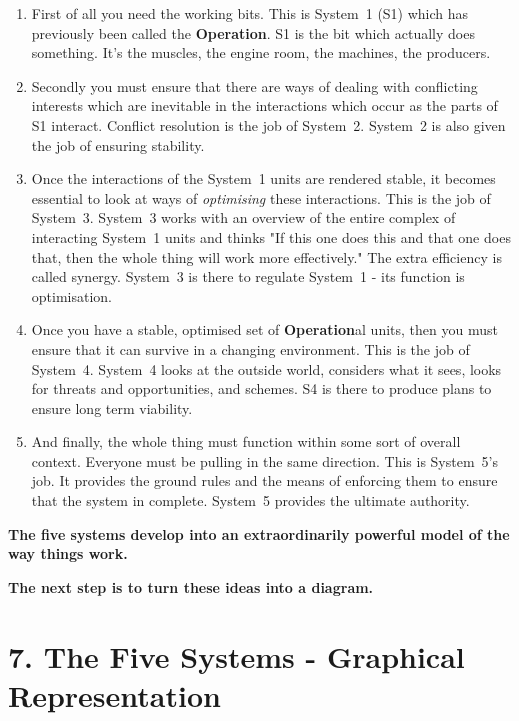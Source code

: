 \begin{enumerate}
  \item First of all you need the working bits. This is System 1 (S1) which has previously been called the \textcolor{O}{\textbf{Operation}}. S1 is the bit which actually does something. It's the muscles, the engine room, the machines, the producers.

  \item Secondly you must ensure that there are ways of dealing with conflicting interests which are inevitable in the interactions which occur as the parts of S1 interact. Conflict resolution is the job of System 2. System 2 is also given the job of ensuring stability.

  \item Once the interactions of the System 1 units are rendered stable, it becomes essential to look at ways of \textit{optimising} these interactions. This is the job of System 3. System 3 works with an overview of the entire complex of interacting System 1 units and thinks "If this one does this and that one does that, then the whole thing will work more effectively." The extra efficiency is called synergy. System 3 is there to regulate System 1 - its function is optimisation.

  \item Once you have a stable, optimised set of \textcolor{O}{\textbf{Operation}}al units, then you must ensure that it can survive in a changing environment. This is the job of System 4. System 4 looks at the outside world, considers what it sees, looks for threats and opportunities, and schemes. S4 is there to produce plans to ensure long term viability.

  \item And finally, the whole thing must function within some sort of overall context. Everyone must be pulling in the same direction. This is System 5's job. It provides the ground rules and the means of enforcing them to ensure that the system in complete. System 5 provides the ultimate authority.

\end{enumerate}

\begin{center}
	\textbf{The five systems develop into an extraordinarily powerful model of the way things work.}

	\textbf{The next step is to turn these ideas into a diagram.}
\end{center}

\section*{7. The Five Systems - Graphical Representation}

